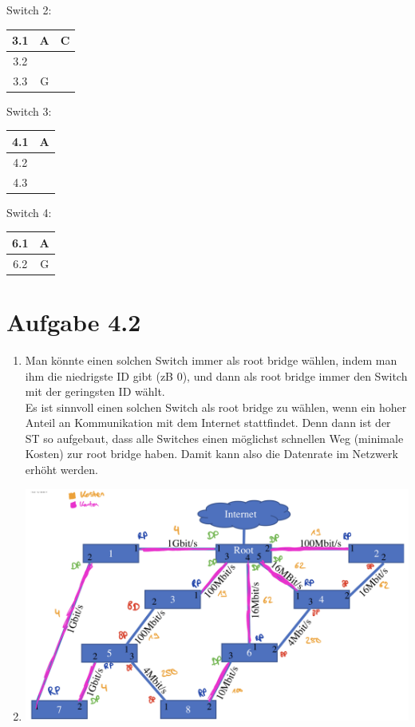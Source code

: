\documentclass[12pt, a4paper]{article}
\begin{document}
\begin{enumerate}[label=\arabic*.]
			Switch 2:
			\begin{center}
				\begin{tabular}{c|c c}
					3.1 & A & C \\
					\hline
					3.2 \\
					\hline
					3.3 & G\\
				\end{tabular}
			\end{center}
			
			Switch 3:
			\begin{center}
				\begin{tabular}{c|c}
					4.1 & A \\
					\hline
					4.2 \\
					\hline
					4.3 \\
				\end{tabular}
			\end{center}
			
			Switch 4:
			\begin{center}
				\begin{tabular}{c|c}
					6.1 & A \\
					\hline
					6.2 & G\\
				\end{tabular}
			\end{center}
\end{enumerate}


\newpage


\section*{Aufgabe 4.2}
\begin{enumerate}[label=\alph*)]
	\item	Man könnte einen solchen Switch immer als root bridge wählen, indem man ihm die niedrigste ID gibt (zB 0), und dann als root bridge immer den Switch mit der geringsten ID wählt.\\
			Es ist sinnvoll einen solchen Switch als root bridge zu wählen, wenn ein hoher Anteil an Kommunikation mit dem Internet stattfindet. Denn dann ist der ST so aufgebaut, dass alle Switches einen möglichst schnellen Weg (minimale Kosten) zur root bridge haben. Damit kann also die Datenrate im Netzwerk erhöht werden.
	\item	\includegraphics[scale=0.36]{4.4_b.png}
\end{enumerate}
\end{document}
